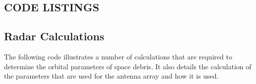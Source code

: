 \documentclass[11pt]{witseiepaper}
\begin{document}
\begin{bibunit}[witseie]
\section{CODE LISTINGS} \label{sec:CodeListings}

\subsection{Radar Calculations} \label{sec:RadarCalculations}
The following code illustrates a number of calculations that are required to determine the orbital parameters of space debris. It also details the calculation of the parameters that are used for the antenna array and how it is used.



\putbib[references]
\end{bibunit}
\end{document}
